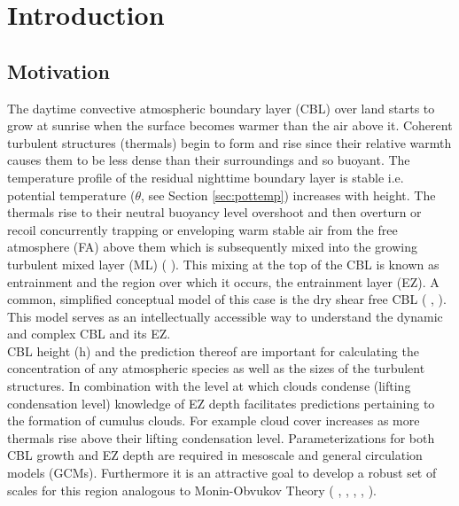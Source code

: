 \chapter{Introduction} 
\label{ch:Introduction}
\setlength{\parindent}{0cm}

\section{Motivation}
\label{sec:Mot}

The daytime convective atmospheric boundary layer (\acs{CBL}) over land starts to grow at sunrise when the surface becomes warmer than the air above it.  Coherent turbulent structures (thermals) begin to form and rise since their relative warmth causes them to be less dense than their surroundings and so buoyant.  The temperature profile of the residual nighttime boundary layer is stable i.e. potential temperature ($\theta$, see Section \ref{sec:pottemp}) increases with height.  The thermals rise to their neutral buoyancy level overshoot and then overturn or recoil concurrently trapping or enveloping warm stable air from the free atmosphere (FA) above them which is subsequently mixed into the growing turbulent mixed layer (\acs{ML}) (\citeauthor{Stull-BLMetIntro} \citeyear{Stull-BLMetIntro}).  This mixing at the top of the \acs{CBL} is known as entrainment and the region over which it occurs, the entrainment layer (\acs{EZ}). A common, simplified conceptual model of this case is the dry shear free \acs{CBL} (\citeauthor{SullMoengStev} \citeyear{SullMoengStev}, \citeauthor{FedConzMir04} \citeyear{FedConzMir04} \citeauthor{BrooksFowler2} \citeyear{BrooksFowler2}). This model serves as an intellectually accessible way to understand the dynamic and complex \acs{CBL} and its \acs{EZ}.\\

\acs{CBL} height (h) and the prediction thereof are important for calculating the concentration of any atmospheric species as well as the sizes of the turbulent structures.  In combination with the level at which clouds condense (lifting condensation level) knowledge of \acs{EZ} depth facilitates predictions pertaining to the formation of cumulus clouds.  For example cloud cover increases as more thermals rise above their lifting condensation level.  Parameterizations for both \acs{CBL} growth and \acs{EZ} depth are required in mesoscale and general circulation models (\acs{GCM}s).  Furthermore it is an attractive goal to develop a robust set of scales for this region analogous to Monin-Obvukov Theory (\citeauthor{Stull-BLMetIntro} \citeyear{Stull-BLMetIntro}, \citeauthor{Traum11} \citeyear{Traum11}, \citeauthor{SteynBaldHoff} \citeyear{SteynBaldHoff}, \citeauthor{StullNelEl} \citeyear{StullNelEl}, \citeauthor{Sorbjan} \citeyear{Sorbjan}).\\

